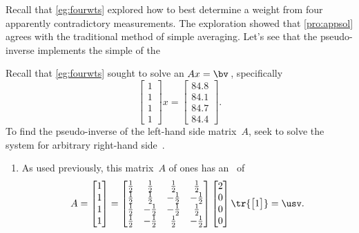 \begin{reduce}
\begin{example}  
Recall that \cref{eg:fourwts} explored how to best determine a  weight from four apparently contradictory measurements.
The exploration showed that \cref{pro:appsol} agrees with the traditional method of simple averaging.
Let's see that the pseudo-inverse implements the simple  of the 

Recall that \cref{eg:fourwts} sought to solve an  \(Ax=\bv\)\,, specifically
\begin{equation*}
\begin{bmatrix} 1\\1\\1\\1 \end{bmatrix}x
=\begin{bmatrix} 84.8\\84.1\\84.7\\84.4 \end{bmatrix}.
\end{equation*}
To find the pseudo-inverse of the left-hand side matrix~\(A\), seek to solve the system for arbitrary right-hand side~\bv.
\begin{enumerate}
\item As used previously, this matrix~\(A\) of ones has an \svd\ of
\def\h{\frac12}
\begin{equation*}
A=\begin{bmatrix} 1\\1\\1\\1 \end{bmatrix}
=\begin{bmatrix} \h&\h&\h&\h
\\\h&\h&-\h&-\h
\\\h&-\h&-\h&\h
\\\h&-\h&\h&-\h \end{bmatrix}
\begin{bmatrix} 2\\0\\0\\0 \end{bmatrix}
\tr{\begin{bmatrix} 1 \end{bmatrix}}
=\usv.
\end{equation*}


\end{enumerate}
\end{example}
\end{reduce}
